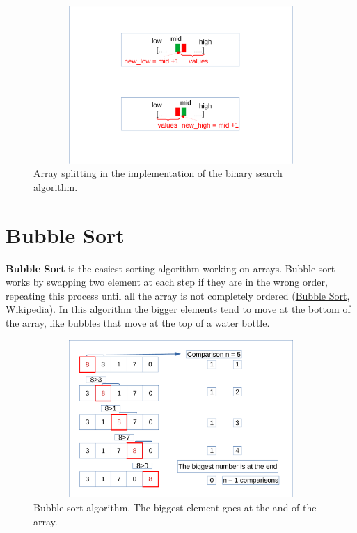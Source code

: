 \begin{figure}[hb]
	\includegraphics[width=14cm,height=6cm]{chapters/searchandsorting/images/sorting_3.pdf}
	\caption[]{Array splitting in the implementation of the binary search algorithm.}
	\label{sorting_3}
\end{figure}

\newpage
\section{Bubble Sort}
\textbf{Bubble Sort} is the easiest sorting algorithm working on arrays. Bubble sort works by swapping two element at each step if they are in the wrong order, repeating this process until all the array is not completely ordered \cite{wikibubblesort} (\href{https://en.wikipedia.org/wiki/Bubble_sort}{Bubble Sort, Wikipedia}). In this algorithm the bigger elements tend to move at the bottom of the array, like bubbles that move at the top of a water bottle.

\begin{figure}[hb]
	\includegraphics[width=14cm,height=6cm]{chapters/searchandsorting/images/sorting_4.pdf}
	\caption[]{Bubble sort algorithm. The biggest element goes at the and of the array.}
	\label{sorting_4}
\end{figure}

